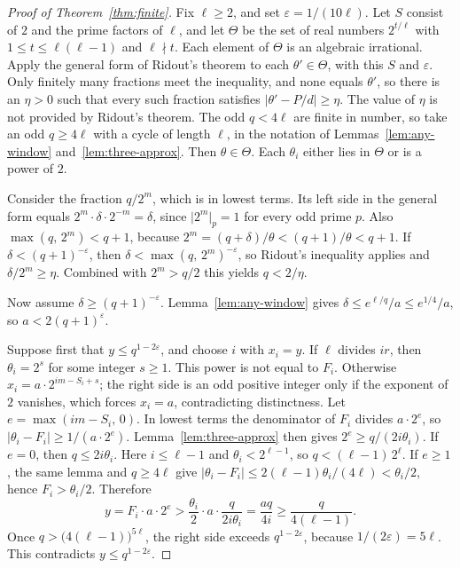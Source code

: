 \documentclass[11pt]{article}
\begin{document}
\begin{proof}[Proof of Theorem~\ref{thm:finite}]
Fix $\ell \ge 2$, and set $\varepsilon = 1/(10\ell)$.
Let $S$ consist of $2$ and the prime factors of $\ell$, and let $\Theta$ be the set of real numbers $2^{t/\ell}$ with $1 \le t \le \ell(\ell-1)$ and $\ell \nmid t$.
Each element of $\Theta$ is an algebraic irrational.
Apply the general form of Ridout's theorem to each $\theta' \in \Theta$, with this $S$ and $\varepsilon$.
Only finitely many fractions meet the inequality, and none equals $\theta'$, so there is an $\eta > 0$ such that every such fraction satisfies $\lvert \theta' - P/d \rvert \ge \eta$.
The value of $\eta$ is not provided by Ridout's theorem.
The odd $q < 4\ell$ are finite in number, so take an odd $q \ge 4\ell$ with a cycle of length $\ell$, in the notation of Lemmas~\ref{lem:any-window} and~\ref{lem:three-approx}.
Then $\theta \in \Theta$.
Each $\theta_i$ either lies in $\Theta$ or is a power of $2$.

Consider the fraction $q/2^m$, which is in lowest terms.
Its left side in the general form equals $2^m \cdot \delta \cdot 2^{-m} = \delta$, since $\lvert 2^m \rvert_p = 1$ for every odd prime $p$.
Also $\max(q,\, 2^m) < q+1$, because $2^m = (q+\delta)/\theta < (q+1)/\theta < q+1$.
If $\delta < (q+1)^{-\varepsilon}$, then $\delta < \max(q,\, 2^m)^{-\varepsilon}$, so Ridout's inequality applies and $\delta/2^m \ge \eta$.
Combined with $2^m > q/2$ this yields $q < 2/\eta$.

Now assume $\delta \ge (q+1)^{-\varepsilon}$.
Lemma~\ref{lem:any-window} gives $\delta \le e^{\ell/q}/a \le e^{1/4}/a$, so $a < 2(q+1)^\varepsilon$.

Suppose first that $y \le q^{1-2\varepsilon}$, and choose $i$ with $x_i = y$.
If $\ell$ divides $ir$, then $\theta_i = 2^s$ for some integer $s \ge 1$.
This power is not equal to $F_i$.
Otherwise $x_i = a \cdot 2^{im - S_i + s}$; the right side is an odd positive integer only if the exponent of $2$ vanishes, which forces $x_i = a$, contradicting distinctness.
Let $e = \max(im - S_i,\, 0)$.
In lowest terms the denominator of $F_i$ divides $a \cdot 2^e$, so $\lvert \theta_i - F_i \rvert \ge 1/(a \cdot 2^e)$.
Lemma~\ref{lem:three-approx} then gives $2^e \ge q/(2i\theta_i)$.
If $e = 0$, then $q \le 2i\theta_i$.
Here $i \le \ell-1$ and $\theta_i < 2^{\ell-1}$, so $q < (\ell-1)\, 2^\ell$.
If $e \ge 1$, the same lemma and $q \ge 4\ell$ give $\lvert \theta_i - F_i \rvert \le 2(\ell-1)\theta_i/(4\ell) < \theta_i/2$, hence $F_i > \theta_i/2$.
Therefore
\[
y = F_i \cdot a \cdot 2^e > \frac{\theta_i}{2} \cdot a \cdot \frac{q}{2i\theta_i} = \frac{aq}{4i} \ge \frac{q}{4(\ell-1)}.
\]
Once $q > \bigl(4(\ell-1)\bigr)^{5\ell}$, the right side exceeds $q^{1-2\varepsilon}$, because $1/(2\varepsilon) = 5\ell$.
This contradicts $y \le q^{1-2\varepsilon}$.


\end{proof}
\end{document}
